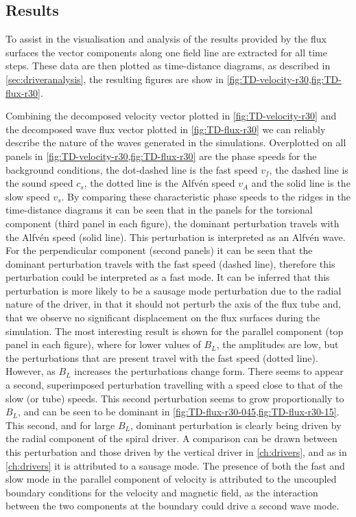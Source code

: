 \documentclass[a4paper,12pt,fourier,authoryear,custommargin]{Classes/PhDThesisPSnPDF}
\begin{document}
\subsection{Results}\label{subsec:expfac-results}

To assist in the visualisation and analysis of the results provided by the flux surfaces the vector components along one field line are extracted for all time steps.
These data are then plotted as time-distance diagrams, as described in \cref{sec:driveranalysis}, the resulting figures are show in \cref{fig:TD-velocity-r30,fig:TD-flux-r30}.

Combining the decomposed velocity vector plotted in \cref{fig:TD-velocity-r30} and the decomposed wave flux vector plotted in \cref{fig:TD-flux-r30} we can reliably describe the nature of the waves generated in the simulations.
Overplotted on all panels in \cref{fig:TD-velocity-r30,fig:TD-flux-r30} are the phase speeds for the background conditions, the dot-dashed line is the fast speed $v_f$, the dashed line is the sound speed $c_s$, the dotted line is the Alfv\'en speed $v_A$ and the solid line is the slow speed $v_s$.
By comparing these characteristic phase speeds to the ridges in the time-distance diagrams it can be seen that in the panels for the torsional component (third panel in each figure), the dominant perturbation travels with the Alfv\'en speed (solid line).
This perturbation is interpreted as an Alfv\'en wave.
For the perpendicular component (second panels) it can be seen that the dominant perturbation travels with the fast speed (dashed line), therefore this perturbation could be interpreted as a fast mode.
It can be inferred that this perturbation is more likely to be a sausage mode perturbation due to the radial nature of the driver, in that it should not perturb the axis of the flux tube and, that we observe no significant displacement on the flux surfaces during the simulation.
The most interesting result is shown for the parallel component (top panel in each figure), where for lower values of $B_L$, the amplitudes are low, but the perturbations that are present travel with the fast speed (dotted line).
However, as $B_L$ increases the perturbations change form.
There seems to appear a second, superimposed perturbation travelling with a speed close to that of the slow (or tube) speeds.
This second perturbation seems to grow proportionally to $B_L$, and can be seen to be dominant in \cref{fig:TD-flux-r30-045,fig:TD-flux-r30-15}.
This second, and for large $B_L$, dominant perturbation is clearly being driven by the radial component of the spiral driver.
A comparison can be drawn between this perturbation and those driven by the vertical driver in \cref{ch:drivers}, and as in \cref{ch:drivers} it is attributed to a sausage mode.
The presence of both the fast and slow mode in the parallel component of velocity is attributed to the uncoupled boundary conditions for the velocity and magnetic field, as the interaction between the two components at the boundary could drive a second wave mode.
\end{document}
